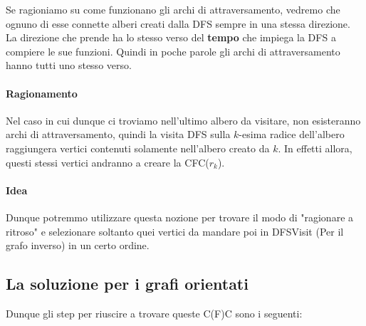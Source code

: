 Se ragioniamo su come funzionano gli archi di attraversamento, vedremo che ognuno di esse connette alberi creati dalla DFS sempre in una stessa direzione. La direzione che prende ha lo stesso verso del \textbf{tempo} che impiega la DFS a compiere le sue funzioni. Quindi in poche parole gli archi di attraversamento hanno tutti uno stesso verso.

\paragraph{Ragionamento}
	Nel caso in cui dunque ci troviamo nell'ultimo albero da visitare, non esisteranno archi di attraversamento, quindi la visita DFS sulla $k$-esima radice dell'albero raggiungera vertici contenuti solamente nell'albero creato da $k$.
	In effetti allora, questi stessi vertici andranno a creare la CFC($r_k$).




\paragraph{Idea}Dunque potremmo utilizzare questa nozione per trovare il modo di "ragionare a ritroso" e selezionare soltanto quei vertici da mandare poi in DFSVisit (Per il grafo inverso) in un certo ordine.

\subsection{La soluzione per i grafi orientati}

Dunque gli step per riuscire a trovare queste C(F)C sono i seguenti:

